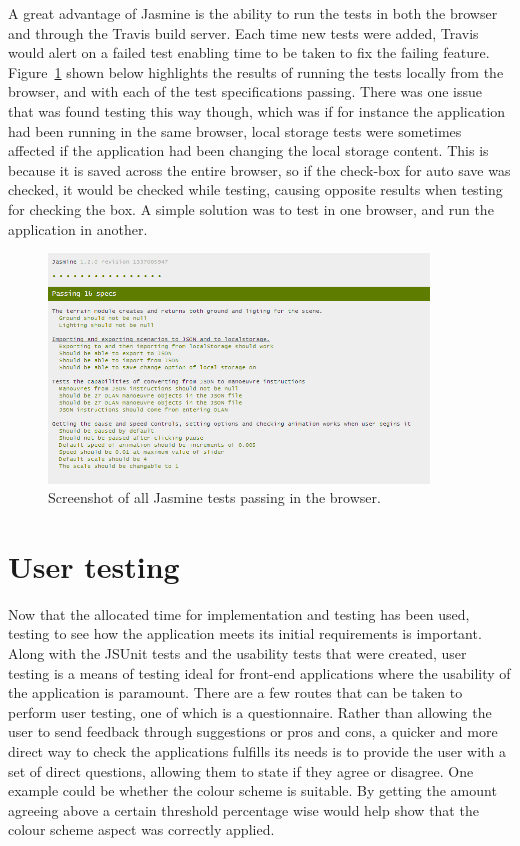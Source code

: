 A great advantage of Jasmine is the ability to run the tests in both the browser and through the Travis build server. Each time new tests were added, Travis would alert on a failed test enabling time to be taken to fix the failing feature. Figure~\ref{fig:jasmine} shown below highlights the results of running the tests locally from the browser, and with each of the test specifications passing. There was one issue that was found testing this way though, which was if for instance the application had been running in the same browser, local storage tests were sometimes affected if the application had been changing the local storage content. This is because it is saved across the entire browser, so if the check-box for auto save was checked, it would be checked while testing, causing opposite results when testing for checking the box. A simple solution was to test in one browser, and run the application in another.

\begin{figure}[h!]
  \centering
      \includegraphics[width=0.9\textwidth]{images/jasmine.png}
  \caption{Screenshot of all Jasmine tests passing in the browser.}
  \label{fig:jasmine}
\end{figure}

\section{User testing}
Now that the allocated time for implementation and testing has been used, testing to see how the application meets its initial requirements is important. Along with the JSUnit tests and the usability tests that were created, user testing is a means of testing ideal for front-end applications where the usability of the application is paramount. There are a few routes that can be taken to perform user testing, one of which is a questionnaire. Rather than allowing the user to send feedback through suggestions or pros and cons, a quicker and more direct way to check the applications fulfills its needs is to provide the user with a set of direct questions, allowing them to state if they agree or disagree. One example could be whether the colour scheme is suitable. By getting the amount agreeing above a certain threshold percentage wise would help show that the colour scheme aspect was correctly applied.

